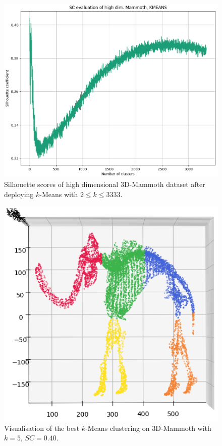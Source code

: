 \begin{figure}[!]
	\centering
	\includegraphics[width=0.85\columnwidth]{images/SC_KMEANS_MAMMOTH.png}
	\caption[Silhouette Scores for 3D-Mammoth]{Silhouette scores of high dimensional 3D-Mammoth dataset after deploying $k$-Means with $2\leq k \leq 3333$.}
    \label{fig:SC_KMEANS_MAMMOTH}
\end{figure}

\begin{figure}[!]
	\centering
	\includegraphics[width=0.5\columnwidth]{images/KMEANS_MAMMOTH_5.png}
	\caption[Visualisation of Best Clustering on 3D-Mammoth]{Visualisation of the best $k$-Means clustering on 3D-Mammoth with $k=5$, $SC=0.40$.}
    \label{fig:KMEANS_MAMMOTH_5}
\end{figure}


